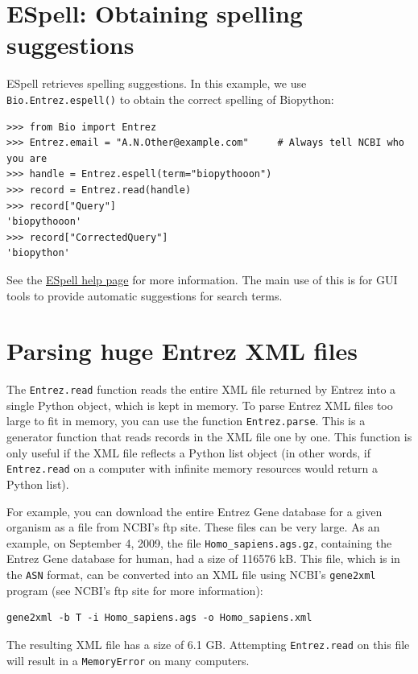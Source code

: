\documentclass{report}
\begin{document}
\section{ESpell: Obtaining spelling suggestions}
ESpell retrieves spelling suggestions. In this example, we use \verb+Bio.Entrez.espell()+ to obtain the correct spelling of Biopython:

\begin{verbatim}
>>> from Bio import Entrez
>>> Entrez.email = "A.N.Other@example.com"     # Always tell NCBI who you are
>>> handle = Entrez.espell(term="biopythooon")
>>> record = Entrez.read(handle)
>>> record["Query"]
'biopythooon'
>>> record["CorrectedQuery"]
'biopython'
\end{verbatim}
See the \href{http://www.ncbi.nlm.nih.gov/entrez/query/static/espell\_help.html}{ESpell help page} for more information.
The main use of this is for GUI tools to provide automatic suggestions for search terms.

\section{Parsing huge Entrez XML files}

The \verb+Entrez.read+ function reads the entire XML file returned by Entrez into a single Python object, which is kept in memory. To parse Entrez XML files too large to fit in memory, you can use the function \verb+Entrez.parse+. This is a generator function that reads records in the XML file one by one. This function is only useful if the XML file reflects a Python list object (in other words, if \verb+Entrez.read+ on a computer with infinite memory resources would return a Python list).

For example, you can download the entire Entrez Gene database for a given organism as a file from NCBI's ftp site. These files can be very large. As an example, on September 4, 2009, the file \verb+Homo_sapiens.ags.gz+, containing the Entrez Gene database for human, had a size of 116576 kB. This file, which is in the \verb+ASN+ format, can be converted into an XML file using NCBI's \verb+gene2xml+ program (see NCBI's ftp site for more information):

\begin{verbatim}
gene2xml -b T -i Homo_sapiens.ags -o Homo_sapiens.xml
\end{verbatim}

The resulting XML file has a size of 6.1 GB. Attempting \verb+Entrez.read+ on this file will result in a \verb+MemoryError+ on many computers.
\end{document}
